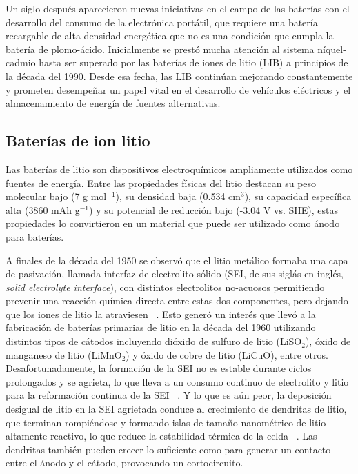 Un siglo después aparecieron nuevas iniciativas en el campo de las baterías con
el desarrollo del consumo de la electrónica portátil, que requiere una batería 
recargable de alta densidad energética que no es una condición que cumpla la 
batería de plomo-ácido. Inicialmente se prestó mucha atención al sistema 
níquel-cadmio hasta ser superado por las baterías de iones de litio (LIB) a 
principios de la década del 1990. Desde esa fecha, las LIB continúan mejorando
constantemente y prometen desempeñar un papel vital en el desarrollo de vehículos
eléctricos y el almacenamiento de energía de fuentes alternativas. %

\subsection{Baterías de ion litio}

Las baterías de litio son dispositivos electroquímicos ampliamente utilizados 
como fuentes de energía. Entre las propiedades físicas del litio destacan su 
peso molecular bajo (7 g mol$^{-1}$), su densidad baja (0.534 cm$^3$), su 
capacidad específica alta (3860 mAh g$^{-1}$) y su potencial de reducción bajo 
(-3.04 V vs. SHE), estas propiedades lo convirtieron en un material que puede 
ser utilizado como ánodo para baterías. 

A finales de la década del 1950 se observó que el litio metálico formaba una capa 
de pasivación, llamada interfaz de electrolito sólido (SEI, de sus siglás en 
inglés, \textit{solid electrolyte interface}), con distintos electrolitos 
no-acuosos permitiendo prevenir una reacción química directa entre estas dos 
componentes, pero dejando que los iones de litio la atraviesen ~\cite{peled1979}. 
Esto generó un interés que llevó a la fabricación de baterías primarias de litio 
en la década del 1960 utilizando distintos tipos de cátodos incluyendo dióxido de 
sulfuro de litio (LiSO$_2$), óxido de manganeso de litio (LiMnO$_2$) y óxido de 
cobre de litio (LiCuO), entre otros. Desafortunadamente, la formación de la SEI 
no es estable durante ciclos prolongados y se agrieta, lo que lleva a un consumo 
continuo de electrolito y litio para la reformación continua de la SEI 
~\cite{besenhard1976}. Y lo que es aún peor, la deposición desigual de litio en 
la SEI agrietada conduce al crecimiento de dendritas de litio, que terminan 
rompiéndose y formando islas de tamaño nanométrico de litio altamente reactivo, 
lo que reduce la estabilidad térmica de la celda ~\cite{yamaki1998}. Las 
dendritas también pueden crecer lo suficiente como para generar un contacto 
entre el ánodo y el cátodo, provocando un cortocircuito. 

